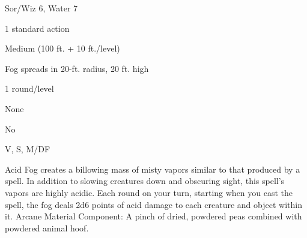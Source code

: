 
\begin{description*}
\item[Level:] Sor/Wiz 6, Water 7
\item[Casting Time:] 1 standard action
\item[Range:] Medium (100 ft. + 10 ft./level)
\item[Effect:] Fog spreads in 20-ft. radius, 20 ft. high
\item[Duration:] 1 round/level
\item[Saving Throw:] None
\item[Spell Resistance:] No
\item[Components:] V, S, M/DF
\end{description*}

Acid Fog creates a billowing mass of misty vapors similar to that produced
by a  spell. In addition to slowing creatures down and obscuring
sight, this spell's vapors are highly acidic. Each round on your turn, starting
when you cast the spell, the fog deals 2d6 points of acid damage to each creature
and object within it.
Arcane Material Component: A pinch of dried, powdered peas combined with
powdered animal hoof.